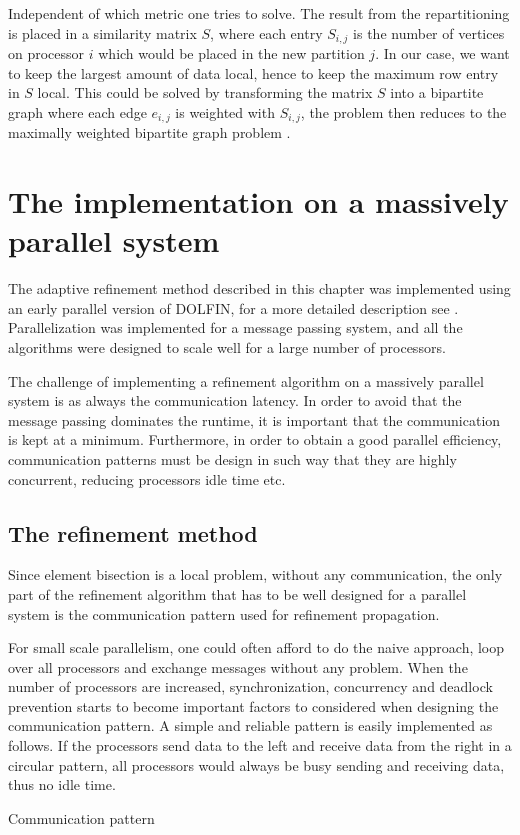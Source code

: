 Independent of which metric one tries to solve. The result from the repartitioning is placed in a similarity matrix $S$, where each entry $S_{i,j}$ is the number of vertices on processor $i$ which would be placed in the new partition $j$. In our case, we want to keep the largest amount of data local, hence to keep the maximum row entry in $S$ local. This could be solved by transforming the matrix $S$ into a bipartite graph where each edge $e_{i,j}$ is weighted with $S_{i,j}$, the problem then reduces to the maximally weighted bipartite graph problem \cite{Oli1998a}.

\section{The implementation on a massively parallel system}

The adaptive refinement method described in this chapter was
implemented using an early parallel version of DOLFIN, for a more
detailed description see \cite{Jan2008a}. Parallelization was
implemented for a message passing system, and all the algorithms were
designed to scale well for a large number of processors.

The challenge of implementing a refinement algorithm on a massively
parallel system is as always the communication latency. In order to
avoid that the message passing dominates the runtime, it is important
that the communication is kept at a minimum. Furthermore, in order to
obtain a good parallel efficiency, communication patterns must be
design in such way that they are highly concurrent, reducing
processors idle time etc.

\subsection{The refinement method}

Since element bisection is a local problem, without any communication,
the only part of the refinement algorithm that has to be well designed
for a parallel system is the communication pattern used for refinement
propagation.

For small scale parallelism, one could often afford to do the naive
approach, loop over all processors and exchange messages without any
problem. When the number of processors are increased, synchronization,
concurrency and deadlock prevention starts to become important factors
to considered when designing the communication pattern. A simple and
reliable pattern is easily implemented as follows. If the processors
send data to the left and receive data from the right in a circular
pattern, all processors would always be busy sending and receiving
data, thus no idle time.
\begin{algorithm}
  \caption{Communication pattern}
  \label{alg:cpattern}
\end{algorithm}

